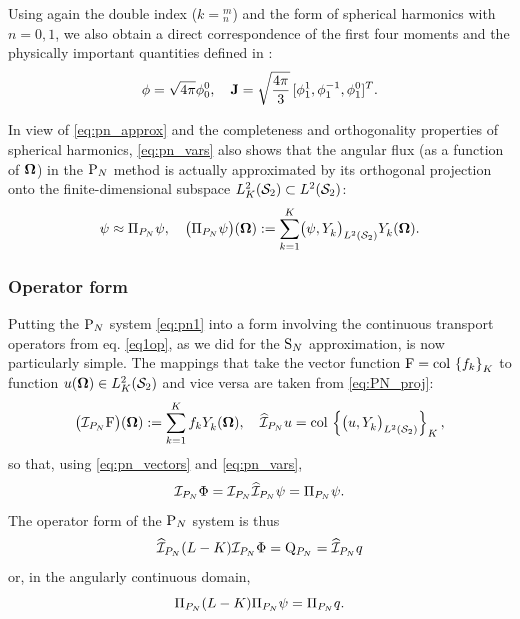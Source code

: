 Using again the double index
($k = {}_n^m$) and the form of spherical harmonics with $n = 0,1$, we also obtain a direct correspondence of the first four moments and the physically important quantities defined in :
$$
	\phi = \sqrt{4\pi}\angmom{0}{0},\quad \bJ = \sqrt{\frac{4\pi }{3}}\, [\angmom{1}{1}, \angmom{1}{-1}, \angmom{1}{0}]^T.
$$


In view of \eqref{eq:pn_approx} and the completeness and orthogonality properties of spherical harmonics,
\eqref{eq:pn_vars} also shows that the angular flux (as a function of $\bomega$) in the $\PN$ method is actually
approximated by its orthogonal projection onto the finite-dimensional subspace $\Lp[2]_K(\Sphere)\subset\Lp[2](\Sphere)$:
\begin{equation}\label{eq:PN_proj}
	\psi \approx \Projop\psi, \quad \bigl(\Projop\psi\bigr)(\bomega) := \sum_{k=1}^{ K}\ipsl{\psi}{\Y{k}{}}
	\Y{k}{}(\bomega).
\end{equation}

\subsubsection{Operator form} \label{sec:pn_op}
Putting the $\PN$ system \eqref{eq:pn1} into a form involving the continuous transport operators
from eq. \eqref{eq1op}, as we did for the $\SN$ approximation, is now particularly simple.
The mappings that take the vector function $\mathrm{F} = \colset{f_k}{K}$ to function
\linebreak[4]$u(\bomega)\in\Lp[2]_K(\Sphere)$ and vice versa are taken from \eqref{eq:PN_proj}:
\begin{equation}\label{eq:pn_op_def}
\bigl(\PiPN\mathrm{F}\bigr)(\bomega) := \sum_{k=1}^{ K} f_k\Y{k}{}(\bomega), \quad
\PihPN u = \col \left\{\bigl(u, \Y{k}{}\bigr)_{\Lp[2](\Sphere)}\right\}_{\idxset{K}},
\end{equation} 
so that, using \eqref{eq:pn_vectors} and \eqref{eq:pn_vars},
$$
\PiPN\Phi = \PiPN\PihPN \psi = \Projop\psi.
$$ 
The operator form of the $\PN$ system is thus
\begin{equation}\label{eq:pn_op}
	\PihPN (L-K) \PiPN\Phi = \mathrm{Q}_{P_N} = \PihPN q
\end{equation}
or, in the angularly continuous domain,
\begin{equation}\label{eq:pn_op2}
	\Projop (L-K) \Projop\psi = \Projop q.
\end{equation}

